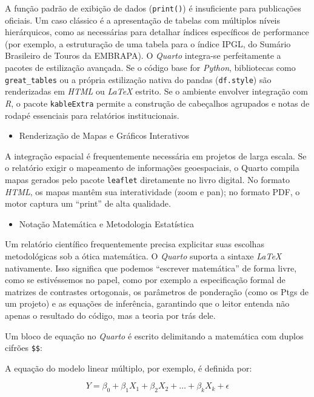 \documentclass[
  brazilian,
  letterpaper,
  DIV=11,
  numbers=noendperiod]{scrreprt}
\providecommand{\tightlist}{%
  \setlength{\itemsep}{0pt}\setlength{\parskip}{0pt}}
\begin{document}
A função padrão de exibição de dados (\texttt{print()}) é insuficiente
para publicações oficiais. Um caso clássico é a apresentação de tabelas
com múltiplos níveis hierárquicos, como as necessárias para detalhar
índices específicos de performance (por exemplo, a estruturação de uma
tabela para o índice IPGL, do Sumário Brasileiro de Touros da EMBRAPA).
O \emph{Quarto} integra-se perfeitamente a pacotes de estilização
avançada. Se o código base for \emph{Python}, bibliotecas como
\texttt{great\_tables} ou a própria estilização nativa do pandas
(\texttt{df.style}) são renderizadas em \emph{HTML} ou \emph{LaTeX}
estrito. Se o ambiente envolver integração com \emph{R}, o pacote
\texttt{kableExtra} permite a construção de cabeçalhos agrupados e notas
de rodapé essenciais para relatórios institucionais.

\begin{itemize}
\tightlist
\item
  Renderização de Mapas e Gráficos Interativos
\end{itemize}

A integração espacial é frequentemente necessária em projetos de larga
escala. Se o relatório exigir o mapeamento de informações geoespaciais,
o Quarto compila mapas gerados pelo pacote \texttt{leaflet} diretamente
no livro digital. No formato \emph{HTML}, os mapas mantêm sua
interatividade (zoom e pan); no formato PDF, o motor captura um
``print'' de alta qualidade.

\begin{itemize}
\tightlist
\item
  Notação Matemática e Metodologia Estatística
\end{itemize}

Um relatório científico frequentemente precisa explicitar suas escolhas
metodológicas sob a ótica matemática. O \emph{Quarto} suporta a sintaxe
\emph{LaTeX} nativamente. Isso significa que podemos ``escrever
matemática'' de forma livre, como se estivéssemos no papel, como por
exemplo a especificação formal de matrizes de contrastes ortogonais, os
parâmetros de ponderação (como os Ptgs de um projeto) e as equações de
inferência, garantindo que o leitor entenda não apenas o resultado do
código, mas a teoria por trás dele.

Um bloco de equação no \emph{Quarto} é escrito delimitando a matemática
com duplos cifrões \texttt{\$\$}:

A equação do modelo linear múltiplo, por exemplo, é definida por:

\[Y = \beta_0 + \beta_1 X_1 + \beta_2 X_2 + \dots + \beta_k X_k + \epsilon\]
\end{document}
